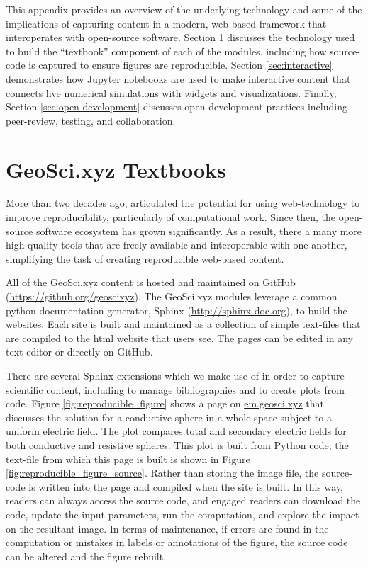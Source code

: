 This appendix provides an overview of the underlying technology and some of the implications of capturing content in a modern, web-based framework that interoperates with open-source software. Section \ref{sec:geosci-textbooks} discusses the technology used to build the ``textbook'' component of each of the modules, including how source-code is captured to ensure figures are reproducible. Section \ref{sec:interactive} demonstrates how Jupyter notebooks are used to make interactive content that connects live numerical simulations with widgets and visualizations. Finally, Section \ref{sec:open-development} discusses open development practices including peer-review, testing, and collaboration.

\section{GeoSci.xyz Textbooks}
\label{sec:geosci-textbooks}

More than two decades ago, \cite{Claerbout1992} articulated the potential for using web-technology to improve reproducibility, particularly of computational work. Since then, the open-source software ecosystem has grown significantly. As a result, there a many more high-quality tools that are freely available and interoperable with one another, simplifying the task of creating reproducible web-based content.

All of the GeoSci.xyz content is hosted and maintained on GitHub (\href{https://github.org/geoscixyz}{https://github.org/geoscixyz}). The GeoSci.xyz modules leverage a common python documentation generator, Sphinx (\href{http://sphinx-doc.org}{http://sphinx-doc.org}), to build the websites. Each site is built and maintained as a collection of simple text-files that are compiled to the html website that users see. The pages can be edited in any text editor or directly on GitHub.

There are several Sphinx-extensions which we make use of in order to capture scientific content, including to manage bibliographies and to create plots from code. Figure \ref{fig:reproducible_figure} shows a page on \href{em.geosci.xyz}{em.geosci.xyz} that discusses the solution for a conductive sphere in a whole-space subject to a uniform electric field. The plot compares total and secondary electric fields for both conductive and resistive spheres. This plot is built from Python code; the text-file from which this page is built is shown in Figure \ref{fig:reproducible_figure_source}. Rather than storing the image file, the source- code is written into the page and compiled when the site is built. In this way, readers can always access the source code, and engaged readers can download the code, update the input parameters, run the computation, and explore the impact on the resultant image. In terms of maintenance, if errors are found in the computation or mistakes in labels or annotations of the figure, the source code can be altered and the figure rebuilt.

